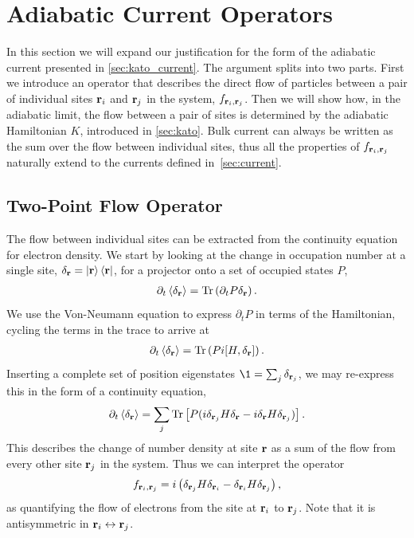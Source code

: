 \section{Adiabatic Current Operators} \label{sec:near_adiabatic}

In this section we will expand our justification for the form of the adiabatic current presented in \textsection\ref{sec:kato_current}. The argument splits into two parts. First we introduce an operator that describes the direct flow of particles between a pair of individual sites $\textbf r_i$ and $\textbf r_{j}$ in the system, $f_{\textbf r_i , \textbf r_j}$. Then we will show how, in the adiabatic limit, the flow between a pair of sites is determined by the adiabatic Hamiltonian $K$, introduced in \textsection\ref{sec:kato}. Bulk current can always be written as the sum over the flow between individual sites, thus all the properties of $f_{\textbf r_i , \textbf r_j}$ naturally extend to the currents defined in~\textsection\ref{sec:current}. 

\subsection{Two-Point Flow Operator}

The flow between individual sites can be extracted from the continuity equation for electron density. We start by looking at the change in occupation number at a single site, $\delta_{\textbf r} = \ket {\textbf r} \bra{\textbf r}$, for a projector onto a set of occupied states $P$,
\begin{align}
    \partial_t \left \langle \delta_{\textbf r} \right \rangle = \textup{Tr} \left (
    \partial_t P \delta_{\textbf r} 
    \right ).
\end{align}
We use the Von-Neumann equation to express $\partial_t P$ in terms of the Hamiltonian, cycling the terms in the trace to arrive at
\begin{align}
    \partial_t \left \langle \delta_{\textbf r }\right \rangle = \textup{Tr} \left (P i [H,\delta_{\textbf r}]\right ).
\end{align}
Inserting a complete set of position eigenstates $\1 = \sum_{j} \delta_{\textbf r_j}$, we may re-express this in the form of a continuity equation,
\begin{align}\label{eqn:continuity_eqn}
    \partial_t \left \langle \delta_{\textbf r }\right \rangle = 
    \sum_{j} \textup{Tr} \left [ P (
    i \delta_{\textbf r_j}H\delta_{ \textbf r }
    -i\delta_{\textbf r}H\delta_{ \textbf r_j }
    )
    \right ].
\end{align}
This describes the change of number density at site $\textbf r$ as a sum of the flow from every other site $\textbf r_j$ in the system. Thus we can interpret the operator 
\begin{align}\label{eqn:two_point_current}
    f_{\textbf r_i,\textbf r_j} = i \left (\delta_{\textbf r_j}H\delta_{\textbf r_i }-\delta_{\textbf r_i}H\delta_{ \textbf r_j }\right ),
\end{align}
as quantifying the flow of electrons from the site at $\textbf r_i$ to $\textbf r_j$. Note that it is antisymmetric in $\textbf r_i \leftrightarrow \textbf r_j$.

